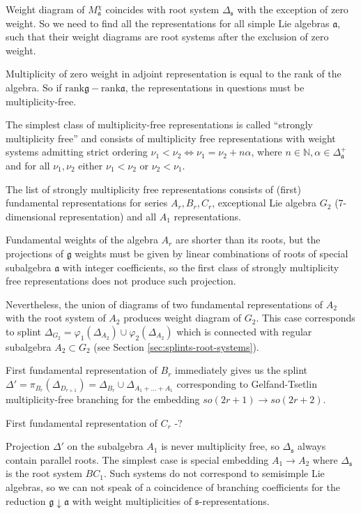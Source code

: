 \documentclass{article}
\newcommand{\gf}{\mathfrak{g}}
\newcommand{\af}{\mathfrak{a}}
\newcommand{\sfr}{\mathfrak{s}}
\begin{document}
Weight diagram of $M^{\chi}_{\af}$ coincides with root system $\Delta_{\sfr}$ with the exception of
zero weight. So we need to find all the representations for all simple Lie algebras $\af$, such that
their weight diagrams are root systems after the exclusion of zero weight.

Multiplicity of zero weight in adjoint representation is equal to the rank of the algebra. So if
$\mathrm{rank}\gf-\mathrm{rank}\af$, the representations in questions must be multiplicity-free.

The simplest class of multiplicity-free representations is called ``strongly multiplicity free''
\cite{lehrer2006strongly} and consists of multiplicity free representations with weight systems
admitting strict ordering $\nu_{1}<\nu_{2} \Leftrightarrow \nu_{1}=\nu_{2}+n \alpha$, where $n\in
\mathbb{N}, \alpha\in \Delta^{+}_{\af}$ and for all $\nu_{1},\nu_{2}$ either $\nu_{1}<\nu_{2}$ or
$\nu_{2}<\nu_{1}$.

The list of strongly multiplicity free representations consists of (first) fundamental representations
for series $A_{r}, B_{r}, C_{r}$, exceptional Lie algebra $G_{2}$ (7-dimensional representation) and
all $A_{1}$ representations. 

Fundamental weights of the algebra $A_{r}$ are shorter than its roots, but the projections of $\gf$
weights must be given by linear combinations of roots of special subalgebra $\af$ with integer
coefficients, so the first class of strongly multiplicity free representations does not produce such
projection. 

Nevertheless, the union of diagrams of two fundamental representations of $A_{2}$ with the root
system of $A_{2}$ produces weight diagram of $G_{2}$. This case corresponds to splint
$\Delta_{G_{2}}=\varphi_{1}( \Delta_{A_{2}})\cup \varphi_{2}(\Delta_{A_{2}})$ which is connected
with regular subalgebra $A_{2}\subset G_{2}$ (see Section \ref{sec:splints-root-systems}).


First fundamental representation of $B_{r}$ immediately gives us the splint $\Delta'=\pi_{B_{r}}\left(
\Delta_{D_{r+1}}\right) = \Delta_{B_{r}}\cup \Delta_{A_{1}+\dots+A_{1}}$ corresponding to Gelfand-Tsetlin
multiplicity-free branching for the embedding $so(2r+1)\to so(2r+2)$. 

First fundamental representation of $C_{r}$ -?

Projection $\Delta'$ on the subalgebra $A_{1}$ is never multiplicity free, so $\Delta_{\sfr}$ always
contain parallel roots. The simplest case is special embedding $A_{1}\to A_{2}$ where
$\Delta_{\sfr}$ is the root system $BC_{1}$. Such systems do not correspond to semisimple Lie
algebras, so we can not speak of a coincidence of branching coefficients for the reduction
$\gf\downarrow \af$ with weight multiplicities of $\sfr$-representations. 
\end{document}
